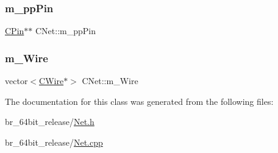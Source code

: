 \subsubsection{\texorpdfstring{m\_ppPin}{m\_ppPin}}
{\footnotesize\ttfamily \mbox{\hyperlink{classCPin}{C\+Pin}}$\ast$$\ast$ C\+Net\+::m\+\_\+pp\+Pin}

\mbox{\label{classCNet_ac281ee8db817b1e7119790fac1e1ba52}} 
\subsubsection{\texorpdfstring{m\_Wire}{m\_Wire}}
{\footnotesize\ttfamily vector$<$\mbox{\hyperlink{classCWire}{C\+Wire}}$\ast$$>$ C\+Net\+::m\+\_\+\+Wire}



The documentation for this class was generated from the following files\+:\begin{DoxyCompactItemize}
\item 
br\+\_\+64bit\+\_\+release/\mbox{\hyperlink{Net_8h}{Net.\+h}}\item 
br\+\_\+64bit\+\_\+release/\mbox{\hyperlink{Net_8cpp}{Net.\+cpp}}\end{DoxyCompactItemize}
